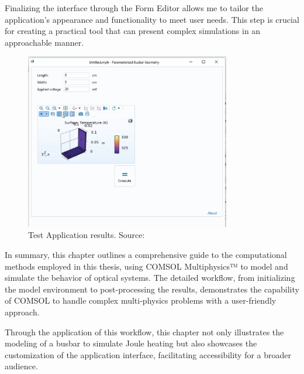 Finalizing the interface through the Form Editor allows me to tailor the application's appearance and functionality to meet user needs. This step is crucial for creating a practical tool that can present complex simulations in an approachable manner.

\begin{figure}[H]
    \centering
    \includegraphics[width=0.8\textwidth]{Chapters/Figures/Chapter 3 Figures/Test Application Results.png}
    \caption{Test Application results. Source: \cite{multiphysics__modeling_nodate}}
    \label{fig:Test Application results}
\end{figure}

In summary, this chapter outlines a comprehensive guide to the computational methods employed in this thesis, using COMSOL Multiphysics™ to model and simulate the behavior of optical systems. The detailed workflow, from initializing the model environment to post-processing the results, demonstrates the capability of COMSOL to handle complex multi-physics problems with a user-friendly approach.

Through the application of this workflow, this chapter not only illustrates the modeling of a busbar to simulate Joule heating but also showcases the customization of the application interface, facilitating accessibility for a broader audience.
